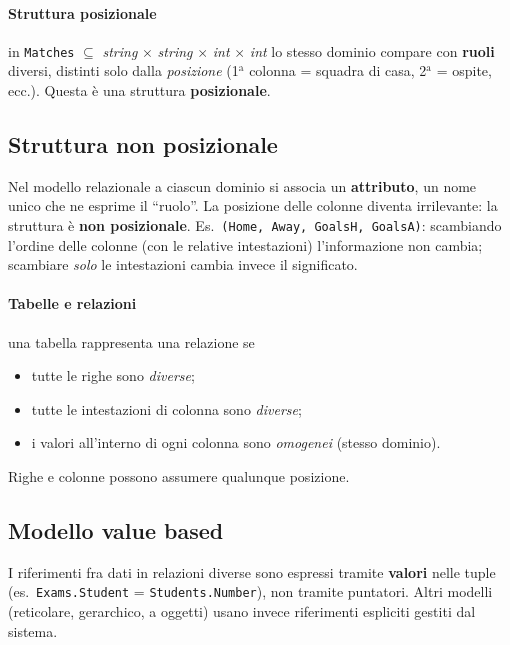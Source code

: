 \documentclass[a4paper,12pt]{article}
\begin{document}
\paragraph{Struttura posizionale} in \texttt{Matches} $\subseteq$ \emph{string}
$\times$ \emph{string} $\times$ \emph{int} $\times$ \emph{int} lo stesso
dominio compare con \textbf{ruoli} diversi, distinti solo dalla \emph{posizione}
(1$^\text{a}$ colonna = squadra di casa, 2$^\text{a}$ = ospite, ecc.). Questa è
una struttura \textbf{posizionale}.

\subsection{Struttura non posizionale}

Nel modello relazionale a ciascun dominio si associa un \textbf{attributo}, un
nome unico che ne esprime il ``ruolo''. La posizione delle colonne diventa
irrilevante: la struttura è \textbf{non posizionale}. Es.\
\texttt{(Home, Away, GoalsH, GoalsA)}: scambiando l'ordine delle colonne (con
le relative intestazioni) l'informazione non cambia; scambiare \emph{solo} le
intestazioni cambia invece il significato.

\paragraph{Tabelle e relazioni} una tabella rappresenta una relazione se
\begin{itemize}
  \item tutte le righe sono \emph{diverse};
  \item tutte le intestazioni di colonna sono \emph{diverse};
  \item i valori all'interno di ogni colonna sono \emph{omogenei} (stesso
    dominio).
\end{itemize}
Righe e colonne possono assumere qualunque posizione.

\subsection{Modello value based}

I riferimenti fra dati in relazioni diverse sono espressi tramite \textbf{valori}
nelle tuple (es.\ \texttt{Exams.Student} = \texttt{Students.Number}), non tramite
puntatori. Altri modelli (reticolare, gerarchico, a oggetti) usano invece
riferimenti espliciti gestiti dal sistema.
\end{document}
